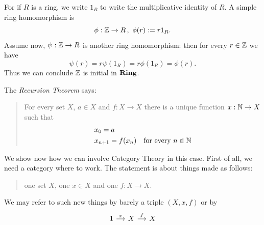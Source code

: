 \begin{example}
  For if \(R\) is a ring, we write \(1_R\) to write the multiplicative
  identity of \(R\). A simple ring homomorphism is
  \[\phi : \mathbb Z \to R \,,\ \phi(r) := r 1_R .\]
  Assume now, \(\psi : \mathbb Z \to R\) is another ring homomorphism: then
  for every \(r \in \mathbb Z\) we have
  \[\psi(r) = r \psi\left(1_R\right) = r \phi\left(1_R\right) = \phi(r) .\]
  Thus we can conclude \(\mathbb Z\) is initial in \(\mathbf{Ring}\).
\end{example}

\begin{example}[Recursion]\label{example:Recursion}
  The {\em Recursion Theorem} says:
  \begin{quotation}
    For every set \(X\), \(a \in X\) and \(f : X \to X\) there is a unique
    function \(x : \mathbb N \to X\) such that
    \begin{align*}
      & x_0 = a \\
      & x_{n+1} = f(x_n) \quad\text{for every } n \in \mathbb N
    \end{align*}
  \end{quotation}
  We show now how we can involve Category Theory in this case. First of
  all, we need a category where to work. The statement is about things
  made as follows:
  \begin{quotation}
    one set \(X\), one \(x \in X\) and one \(f : X \to X\).
  \end{quotation}
  We may refer to such new things by barely a triple \((X, x, f)\) or by
  \[
    \begin{tikzcd}[column sep=small]
      1 \ar["{x}", r] & X \ar["{f}", r] & X

\end{tikzcd}\]
\end{example}
